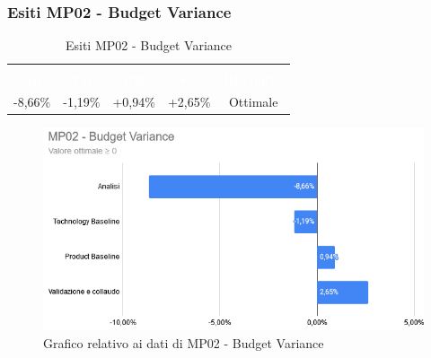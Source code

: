 \subsubsection{Esiti MP02 - Budget Variance}
\begin{longtable}{c c c c c}
\rowcolor{white}\caption{Esiti MP02 - Budget Variance} \\
		\rowcolor{redafk}
\textcolor{white}{\textbf{An}} &
\textcolor{white}{\textbf{TB}} &
\textcolor{white}{\textbf{PB}} &
\textcolor{white}{\textbf{VC}} &
\textcolor{white}{\textbf{Riscontro}} \\
-8,66$\%$ &
-1,19$\%$ &
+0,94$\%$ &
+2,65$\%$ &
Ottimale \\
\end{longtable}

\begin{figure}[H]
\centering
\includegraphics[scale=0.7]{./img/MP02_budget_variance.png}
\caption{Grafico relativo ai dati di MP02 - Budget Variance}
\end{figure}

